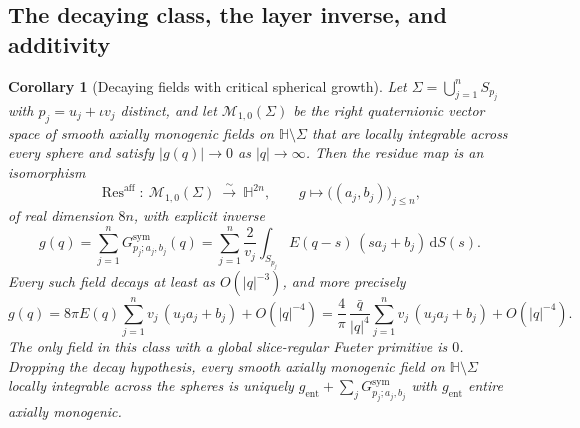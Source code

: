 \documentclass[11pt,a4paper]{article}
\numberwithin{equation}{section}
\newtheorem{corollary}[theorem]{Corollary}
\theoremstyle{definition}
\theoremstyle{remark}
\theoremstyle{plain}
\newcommand{\HH}{\mathbb H}
\newcommand{\abs}[1]{\lvert #1\rvert}
\newcommand{\dd}{\mathrm d}
\newcommand{\Resaff}{\operatorname{Res}^{\mathrm{aff}}}
\begin{document}
\subsection{The decaying class, the layer inverse, and additivity}
\label{e:sec:decaying}

\begin{corollary}[Decaying fields with critical spherical growth]
\label{e:cor:decaying}
Let $\Sigma=\bigcup_{j=1}^{n}S_{p_j}$ with $p_j=u_j+\iota v_j$ distinct,
and let $\mathcal M_{1,0}(\Sigma)$ be the right quaternionic vector space
of smooth axially monogenic fields on $\HH\setminus\Sigma$ that are
\emph{locally integrable across every sphere} and satisfy
$\abs{g(q)}\to0$ as $\abs q\to\infty$. Then the residue map is an
isomorphism
\begin{equation}
 \Resaff:\ \mathcal M_{1,0}(\Sigma)\ \xrightarrow{\ \sim\ }\ \HH^{2n},
 \qquad
 g\longmapsto\bigl((a_j,b_j)\bigr)_{j\le n},
 \label{e:eq:globaliso}
\end{equation}
of real dimension $8n$, with explicit inverse
\begin{equation}
 g(q)=\sum_{j=1}^{n}G^{\mathrm{sym}}_{p_j;a_j,b_j}(q)
     =\sum_{j=1}^{n}\frac2{v_j}\int_{S_{p_j}}
          E(q-s)\,(sa_j+b_j)\,\dd S(s).
 \label{e:eq:globalfield}
\end{equation}
Every such field decays at least as $O(\abs q^{-3})$, and more precisely
\begin{equation}
 g(q)=8\pi E(q)\sum_{j=1}^{n}v_j\,(u_ja_j+b_j)+O(\abs q^{-4})
     =\frac4\pi\,\frac{\bar q}{\abs q^4}
       \sum_{j=1}^{n}v_j\,(u_ja_j+b_j)+O(\abs q^{-4}).
 \label{e:eq:farfieldfirst}
\end{equation}
The only field in this class with a global slice-regular Fueter primitive
is $0$. Dropping the decay hypothesis, every smooth axially monogenic
field on $\HH\setminus\Sigma$ locally integrable across the spheres is
uniquely $g_{\mathrm{ent}}+\sum_jG^{\mathrm{sym}}_{p_j;a_j,b_j}$ with
$g_{\mathrm{ent}}$ entire axially monogenic.
\end{corollary}
\end{document}
